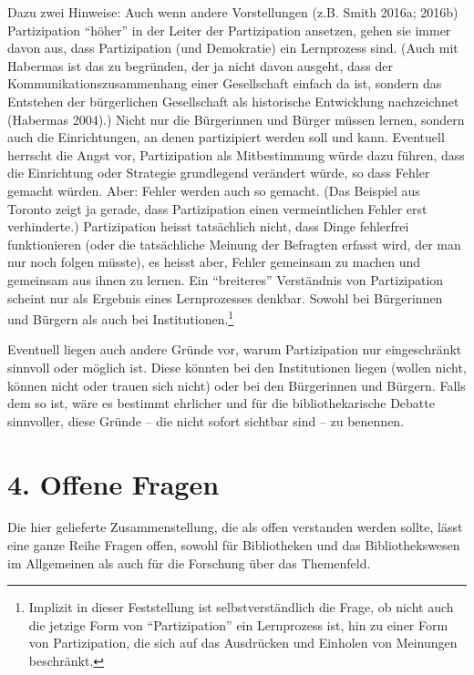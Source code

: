 \documentclass[a4paper,
fontsize=11pt,
oneside,
numbers=noperiodatend,
parskip=half-,
bibliography=totoc,
final
]{scrartcl}
\begin{document}
Dazu zwei Hinweise: Auch wenn andere Vorstellungen (z.B. Smith 2016a;
2016b) Partizipation \enquote{höher} in der Leiter der Partizipation
ansetzen, gehen sie immer davon aus, dass Partizipation (und Demokratie)
ein Lernprozess sind. (Auch mit Habermas ist das zu begründen, der ja
nicht davon ausgeht, dass der Kommunikationszusammenhang einer
Gesellschaft einfach da ist, sondern das Entstehen der bürgerlichen
Gesellschaft als historische Entwicklung nachzeichnet (Habermas 2004).)
Nicht nur die Bürgerinnen und Bürger müssen lernen, sondern auch die
Einrichtungen, an denen partizipiert werden soll und kann. Eventuell
herrscht die Angst vor, Partizipation als Mitbestimmung würde dazu
führen, dass die Einrichtung oder Strategie grundlegend verändert würde,
so dass Fehler gemacht würden. Aber: Fehler werden auch so gemacht. (Das
Beispiel aus Toronto zeigt ja gerade, dass Partizipation einen
vermeintlichen Fehler erst verhinderte.) Partizipation heisst
tatsächlich nicht, dass Dinge fehlerfrei funktionieren (oder die
tatsächliche Meinung der Befragten erfasst wird, der man nur noch folgen
müsste), es heisst aber, Fehler gemeinsam zu machen und gemeinsam aus
ihnen zu lernen. Ein \enquote{breiteres} Verständnis von Partizipation
scheint nur als Ergebnis eines Lernprozesses denkbar. Sowohl bei
Bürgerinnen und Bürgern als auch bei Institutionen.\footnote{Implizit in
  dieser Feststellung ist selbstverständlich die Frage, ob nicht auch
  die jetzige Form von \enquote{Partizipation} ein Lernprozess ist, hin
  zu einer Form von Partizipation, die sich auf das Ausdrücken und
  Einholen von Meinungen beschränkt.}

Eventuell liegen auch andere Gründe vor, warum Partizipation nur
eingeschränkt sinnvoll oder möglich ist. Diese könnten bei den
Institutionen liegen (wollen nicht, können nicht oder trauen sich nicht)
oder bei den Bürgerinnen und Bürgern. Falls dem so ist, wäre es bestimmt
ehrlicher und für die bibliothekarische Debatte sinnvoller, diese Gründe
-- die nicht sofort sichtbar sind -- zu benennen.

\section{4. Offene Fragen}\label{offene-fragen}

Die hier gelieferte Zusammenstellung, die als offen verstanden werden
sollte, lässt eine ganze Reihe Fragen offen, sowohl für Bibliotheken und
das Bibliothekswesen im Allgemeinen als auch für die Forschung über das
Themenfeld.
\end{document}
